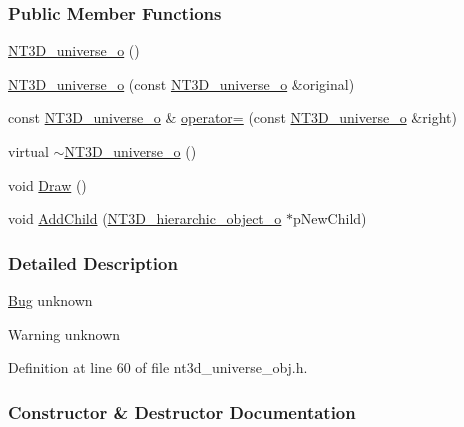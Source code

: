 \subsubsection*{Public Member Functions}
\begin{DoxyCompactItemize}
\item 
\hyperlink{class_n_t3_d__universe__o_ab55795058e493982058fcdeb5265eb7a}{NT3D\_\-universe\_\-o} ()
\item 
\hyperlink{class_n_t3_d__universe__o_aa56b061a4d75953c1c17962ebc768e30}{NT3D\_\-universe\_\-o} (const \hyperlink{class_n_t3_d__universe__o}{NT3D\_\-universe\_\-o} \&original)
\item 
const \hyperlink{class_n_t3_d__universe__o}{NT3D\_\-universe\_\-o} \& \hyperlink{class_n_t3_d__universe__o_adb41a6f1b7de3baea0221df8135f8b04}{operator=} (const \hyperlink{class_n_t3_d__universe__o}{NT3D\_\-universe\_\-o} \&right)
\item 
virtual \hyperlink{class_n_t3_d__universe__o_ac20df3fa9d7add50ca6037200a58add5}{$\sim$NT3D\_\-universe\_\-o} ()
\item 
void \hyperlink{class_n_t3_d__universe__o_ae54eafe95492b36865c0be12ecc8c6fe}{Draw} ()
\item 
void \hyperlink{class_n_t3_d__universe__o_a1a986578100fb80f8c29773aece46493}{AddChild} (\hyperlink{class_n_t3_d__hierarchic__object__o}{NT3D\_\-hierarchic\_\-object\_\-o} $\ast$pNewChild)
\end{DoxyCompactItemize}


\subsubsection{Detailed Description}
\begin{Desc}
\item[\hyperlink{bug__bug000047}{Bug}]unknown \end{Desc}
\begin{DoxyWarning}{Warning}
unknown 
\end{DoxyWarning}


Definition at line 60 of file nt3d\_\-universe\_\-obj.h.



\subsubsection{Constructor \& Destructor Documentation}
